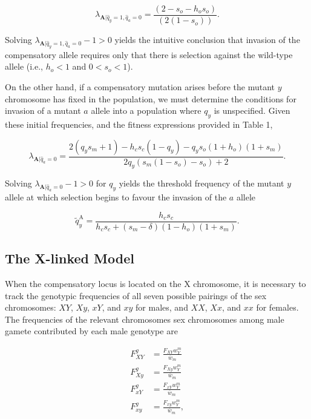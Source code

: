 \documentclass{article}
\begin{document}
\begin{equation} \label{eq:Lambda-a-qy1}
	\lambda_{\mathbf{A}|\hat{q}_y = 1,\hat{q}_a = 0} = \frac{(2 - s_o - h_o s_o)} {(2 (1 - s_o))}.
\end{equation}

\noindent Solving $\lambda_{\mathbf{A}|\hat{q}_y = 1,\hat{q}_a = 0} - 1 > 0$ yields the intuitive conclusion that invasion of the compensatory allele requires only that there is selection against the wild-type allele (i.e.,  $h_o < 1$ and $0 < s_o < 1$).

On the other hand, if a compensatory mutation arises before the mutant $y$ chromosome has fixed in the population, we must determine the conditions for invasion of a mutant $a$ allele into a population where $q_y$ is unspecified. Given these initial frequencies, and the fitness expressions provided in Table 1,

\begin{equation} \label{eq:Lambda-a}
	\lambda_{\mathbf{A}|\hat{q}_a = 0} = \frac{2(q_y s_m + 1) - h_c s_c(1 - q_y) - q_y s_o (1 + h_o)(1 + s_m)} {2 q_y (s_m (1 - s_o) - s_o) + 2}.
\end{equation}

\noindent Solving $\lambda_{\mathbf{A}|\hat{q}_a = 0} - 1 > 0$ for $q_y$ yields the threshold frequency of the mutant $y$ allele at which selection begins to favour the invasion of the $a$ allele

\begin{equation} \label{eq:aInvDelta-threshold}
	\tilde{q}_y^{\text{A}} = \frac{h_c s_c} {h_c s_c + (s_m - \delta)(1 - h_o)(1+s_m)}.
\end{equation}




\subsection{The X-linked Model}

When the compensatory locus is located on the X chromosome, it is necessary to track the genotypic frequencies of all seven possible pairings of the sex chromosomes: $XY$, $Xy$, $xY$, and $xy$ for males, and $XX$, $Xx$, and $xx$ for females. The frequencies of the relevant chromosomes sex chromosomes among male gamete contributed by each male genotype are

\begin{subequations}\begin{align} \label{eq:Fg-Xlinked}
	F_{XY}^{g} &= \frac{F_{XY}w^{m}_{Y}}{\overline{w}_{m}} \\
	F_{Xy}^{g} &= \frac{F_{Xy}w^{m}_{Y}}{\overline{w}_{m}} \\
	F_{xY}^{g} &= \frac{F_{xY}w^{m}_{Y}}{\overline{w}_{m}} \\
	F_{xy}^{g} &= \frac{F_{xy}w^{m}_{Y}}{\overline{w}_{m}}, 
\end{align}\end{subequations}
\end{document}
